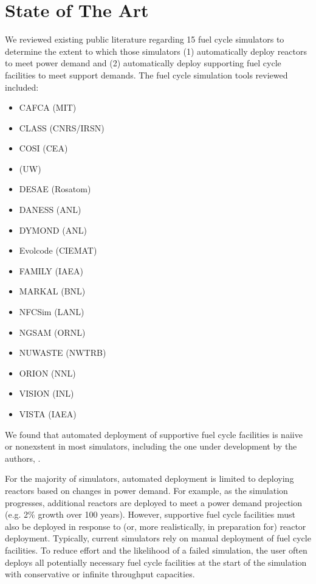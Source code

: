 \section{State of The Art}
We reviewed existing public literature regarding 15 fuel cycle simulators to 
determine the extent to which those simulators (1) automatically deploy reactors to 
meet power demand and (2) automatically deploy supporting fuel cycle facilities 
to meet support demands. The fuel cycle simulation tools reviewed included:
\begin{itemize}
        \item CAFCA (MIT) \cite{guerin_impact_2009}
        \item CLASS (CNRS/IRSN) \cite{mouginot_class_2012}
        \item COSI (CEA) \cite{coquelet-pascal_cosi6:_2015,boucher_international_2010}
        \item \Cyclus (UW) \cite{huff_fundamental_2014} %
        \item DESAE (Rosatom) \cite{boucher_international_2010}
        \item DANESS (ANL) \cite{van_den_durpel_daness:_2006} %
        \item DYMOND (ANL) \cite{boucher_international_2010}
        \item Evolcode (CIEMAT) \cite{boucher_international_2010}
        \item FAMILY (IAEA) \cite{boucher_international_2010}
        \item MARKAL (BNL) \cite{feng_standardized_2016}
        \item NFCSim (LANL) \cite{schneider_nfcsim:_2005}
        \item NGSAM (ORNL) \cite{aubin_development_2013}
        \item NUWASTE (NWTRB) \cite{garrick_nuclear_2011}
        \item ORION (NNL) \cite{feng_standardized_2016}
        \item VISION (INL) \cite{feng_standardized_2016,boucher_international_2010}
        \item VISTA (IAEA) \cite{iaea_nuclear_2007}
\end{itemize}

We found that automated deployment of supportive fuel cycle facilities is naiive or 
nonexstent in most simulators, including the one under development by the 
authors, \Cyclus.

For the majority of simulators, automated deployment is limited to deploying 
reactors based on changes in power demand. 
For example, as the simulation 
progresses, additional reactors are deployed to meet a power demand projection 
(e.g. 2\% growth over 100 years). 
However, supportive fuel cycle facilities must also be deployed in response to 
(or, more realistically, in preparation for) reactor deployment.  
Typically, current simulators rely on manual deployment of fuel cycle 
facilities. To reduce effort and the likelihood of a failed simulation, the 
user often deploys all potentially necessary fuel cycle facilities at the start 
of the simulation with conservative or infinite throughput capacities. 

